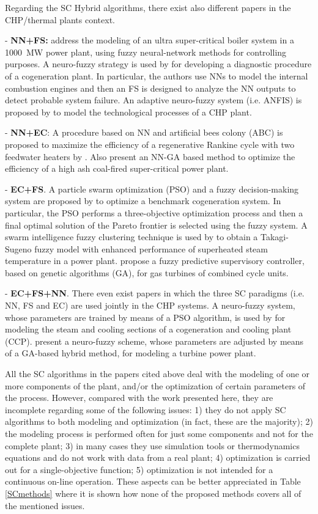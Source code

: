 Regarding the SC Hybrid algorithms, there exist also different papers in the CHP/thermal plants context. 

- \textbf{NN+FS:} \cite{Liu2010} address the modeling of an ultra super-critical boiler system in a \SI{1000}{MW} power plant,  using fuzzy neural-network methods for controlling purposes. A neuro-fuzzy strategy is used by \cite{Bare-2005} for developing a diagnostic procedure of a cogeneration plant. In particular, the authors use NNs to model the internal combustion engines and then an FS is designed to analyze the NN outputs to detect probable system failure. An adaptive neuro-fuzzy system (i.e. ANFIS) is proposed by \cite{Mastacan-2005} to model the technological processes of a CHP plant.

- \textbf{NN+EC}: A procedure based on NN and artificial bees colony (ABC) is proposed to maximize the efficiency of a regenerative Rankine cycle with two feedwater heaters by \cite{Rashidi-2011}. Also \cite{Suresh-2011} present an NN-GA based method to optimize the efficiency of a high ash coal-fired super-critical power plant.

- \textbf{EC+FS}. A particle swarm optimization (PSO) and a fuzzy decision-making system are proposed by \cite{Sayyaadi-2011} to optimize a benchmark cogeneration system. In particular, the PSO performs a three-objective optimization process and then a final optimal solution of the Pareto frontier is selected using the fuzzy system. A swarm intelligence fuzzy clustering technique is used by \cite{Su-12} to obtain a Takagi-Sugeno fuzzy model with enhanced performance of  superheated steam temperature in a power plant. \cite{Saez-2007} propose a fuzzy predictive supervisory controller, based on genetic algorithms (GA), for gas turbines of combined cycle units.

- \textbf{EC+FS+NN}.  There even exist papers in which the three SC paradigms (i.e. NN, FS and EC) are used jointly in the CHP systems. A neuro-fuzzy system, whose parameters are trained by means of a PSO algorithm, is used by \cite{Tamiru-2009} for modeling  the steam and cooling sections of a cogeneration and cooling plant (CCP). \cite{Kwun-2007} present a neuro-fuzzy scheme, whose parameters are adjusted by means of a GA-based hybrid method, for modeling a turbine power plant. 

All the SC algorithms in the papers cited above deal with the modeling of one or more components of the plant, and/or the optimization of certain parameters of the process. However, compared with the work presented here, they are incomplete regarding some of the following issues: 1) they do not apply SC algorithms to both modeling and optimization (in fact, these are the majority); 2) the modeling process is performed often for just some components and not for the complete plant; 3) in many cases they use simulation tools or thermodynamics equations and do not work with data from a real plant; 4) optimization is carried out for a single-objective function; 5) optimization is not intended for a continuous on-line operation. These aspects can be better appreciated in Table \ref{SCmethods} where it is shown how none of the proposed methods covers all of the mentioned issues.


